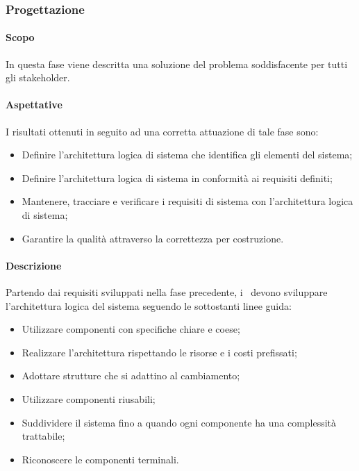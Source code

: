 \documentclass[../NormeDiProgetto.tex]{subfiles}
\begin{document}
		\subsubsection{Progettazione}
			\paragraph{Scopo\\}
				In questa fase viene descritta una soluzione del problema soddisfacente per tutti
				gli stakeholder.
			\paragraph{Aspettative\\}
				I risultati ottenuti in seguito ad una corretta attuazione di tale fase sono:
				\begin{itemize}
					\item Definire l'architettura logica di sistema che identifica gli elementi
					del sistema;
					\item Definire l'architettura logica di sistema in conformità ai requisiti
					definiti;
					\item Mantenere, tracciare e verificare i requisiti di sistema con
					l'architettura logica di sistema;
					\item Garantire la qualità attraverso la correttezza per costruzione.
				\end{itemize}
			\paragraph{Descrizione\\}
				Partendo dai requisiti sviluppati nella fase precedente, i \progettisti\ devono
				sviluppare l'architettura logica del sistema seguendo le sottostanti linee guida:
				\begin{itemize}
					\item Utilizzare componenti con specifiche chiare e coese;
					\item Realizzare l'architettura rispettando le risorse e i costi prefissati;
					\item Adottare strutture che si adattino al cambiamento;
					\item Utilizzare componenti riusabili;
					\item Suddividere il sistema fino a quando ogni componente ha una
					complessità trattabile;
					\item Riconoscere le componenti terminali.
				\end{itemize}
\end{document}
